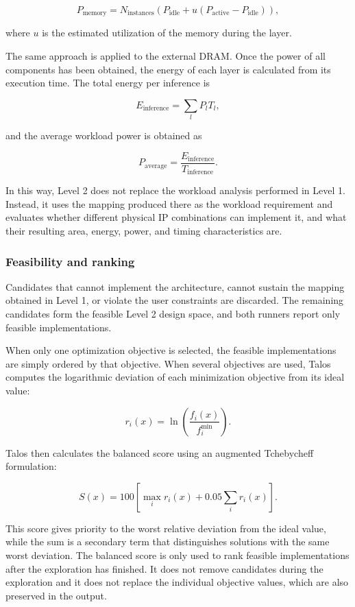 \[
P_{\mathrm{memory}} =
N_{\mathrm{instances}}
\left(
P_{\mathrm{idle}} +
u(P_{\mathrm{active}}-P_{\mathrm{idle}})
\right),
\]

where $u$ is the estimated utilization of the memory during the
layer.

The same approach is applied to the external DRAM. Once the power of
all components has been obtained, the energy of each layer is
calculated from its execution time. The total energy per inference is

\[
E_{\mathrm{inference}} =
\sum_l P_l T_l,
\]

and the average workload power is obtained as

\[
P_{\mathrm{average}} =
\frac{E_{\mathrm{inference}}}
     {T_{\mathrm{inference}}}.
\]

In this way, Level 2 does not replace the workload analysis performed
in Level 1. Instead, it uses the mapping produced there as the
workload requirement and evaluates whether different physical IP
combinations can implement it, and what their resulting area, energy,
power, and timing characteristics are.

\subsubsection{Feasibility and ranking}
\label{subsec:feasibility_ranking}
Candidates that cannot implement the architecture, cannot sustain the
mapping obtained in Level 1, or violate the user constraints are
discarded. The remaining candidates form the feasible Level 2 design
space, and both runners report only feasible implementations.

When only one optimization objective is selected, the feasible
implementations are simply ordered by that objective. When several
objectives are used, Talos computes the logarithmic deviation of each
minimization objective from its ideal value:

\[
r_i(x) = \ln\left(\frac{f_i(x)}{f_i^{\min}}\right).
\]

Talos then calculates the balanced score using an augmented
Tchebycheff formulation:

\[
S(x) = 100 \left[\max_i r_i(x) + 0.05 \sum_i r_i(x)\right].
\]

This score gives priority to the worst relative deviation from the
ideal value, while the sum is a secondary term that distinguishes
solutions with the same worst deviation. The balanced score is only
used to rank feasible implementations after the exploration has
finished. It does not remove candidates during the exploration and it
does not replace the individual objective values, which are also
preserved in the output.


